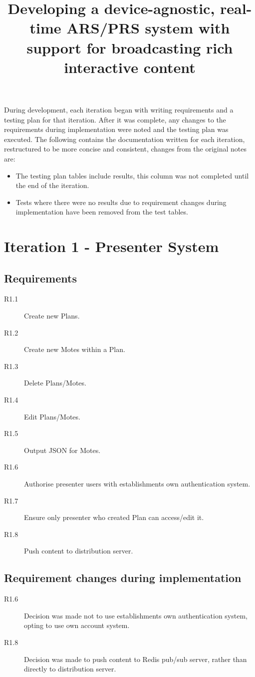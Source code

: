 \documentclass[a4papert,11pt,notitlepage]{article}
\title{Developing a device-agnostic, real-time ARS/PRS system with support for
broadcasting rich interactive content}
\begin{document}
During development, each iteration began with writing requirements and a testing plan for that iteration. After it was complete, any changes to the requirements during implementation were noted and the testing plan was executed. The following contains the documentation written for each iteration, restructured to be more concise and consistent, changes from the original notes are:
\begin{itemize}
\item The testing plan tables include results, this column was not completed until the end of the iteration.
\item Tests where there were no results due to requirement changes during implementation have been removed from the test tables.
\end{itemize}

\section{Iteration 1 - Presenter System}
\subsection{Requirements}
\begin{description}
\item[R1.1] Create new Plans.
\item[R1.2] Create new Motes within a Plan.
\item[R1.3] Delete Plans/Motes.
\item[R1.4] Edit Plans/Motes.
\item[R1.5] Output JSON for Motes.
\item[R1.6] Authorise presenter users with establishments own authentication system.
\item[R1.7] Ensure only presenter who created Plan can access/edit it. 
\item[R1.8] Push content to distribution server.
\end{description}

\subsection{Requirement changes during implementation}
\begin{description}
\item[R1.6] Decision was made not to use establishments own authentication system, opting to use own account system.
\item[R1.8] Decision was made to push content to Redis pub/sub server, rather than directly to distribution server.
\end{description}
\end{document}
